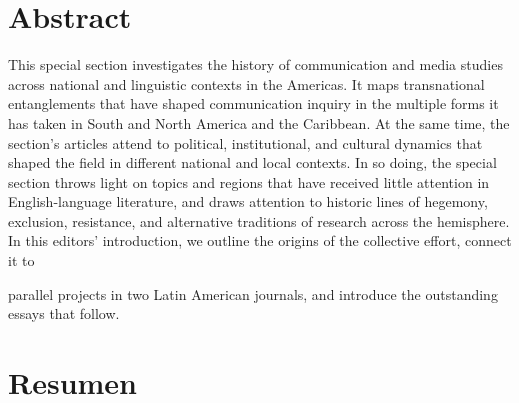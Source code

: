 \documentclass{tufte-handout}
\begin{document}
\begin{titlepage}
\begin{fullwidth}
\vspace*{0.75em} %

\vspace*{0.5em}

\end{fullwidth}

\vspace*{1em}

\hypertarget{abstract}{%
\section{Abstract}\label{abstract}}

This special section investigates the history of communication and media studies across national and linguistic contexts in the Americas. It maps transnational entanglements that have shaped communication inquiry in the multiple forms it has taken in South and North America and the Caribbean. At the same time, the section’s articles attend to political, institutional, and cultural dynamics that shaped the field in different national and local contexts. In so doing, the special section throws light on topics and regions that have received little attention in English-language literature, and draws attention to historic lines of hegemony, exclusion, resistance, and alternative traditions of research across the hemisphere. In this editors’ introduction, we outline the origins of the collective effort, connect it to

\vspace*{4em}



\newpage\noindent parallel projects in two Latin American journals, and introduce the outstanding essays that follow.

\hypertarget{resumen}{%
\section{Resumen}\label{resumen}}


\end{titlepage}
\end{document}
